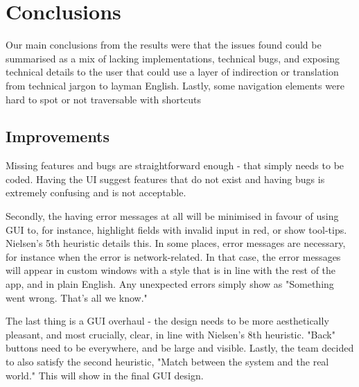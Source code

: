\section{Conclusions}


Our main conclusions from the results were that the issues found could be summarised as a mix of lacking implementations, technical bugs, and exposing technical details to the user that could use a layer of indirection or translation from technical jargon to layman English. Lastly, some navigation elements were hard to spot or not traversable with shortcuts

\subsection{Improvements}

Missing features and bugs are straightforward enough - that simply needs to be coded. Having the UI suggest features that do not exist and having bugs is extremely confusing and is not acceptable. 

Secondly, the having error messages at all will be minimised in favour of using GUI to, for instance, highlight fields with invalid input in red, or show tool-tips. Nielsen's 5th heuristic details this. In some places, error messages are necessary, for instance when the error is network-related. In that case, the error messages will appear in custom windows with a style that is in line with the rest of the app, and in plain English. Any unexpected errors simply show as "Something went wrong. That's all we know." 

The last thing is a GUI overhaul - the design needs to be more aesthetically pleasant, and most crucially, clear, in line with Nielsen's 8th heuristic. "Back" buttons need to be everywhere, and be large and visible. Lastly, the team decided to also satisfy the second heuristic, "Match between the system and the real world." This will show in the final GUI design.

